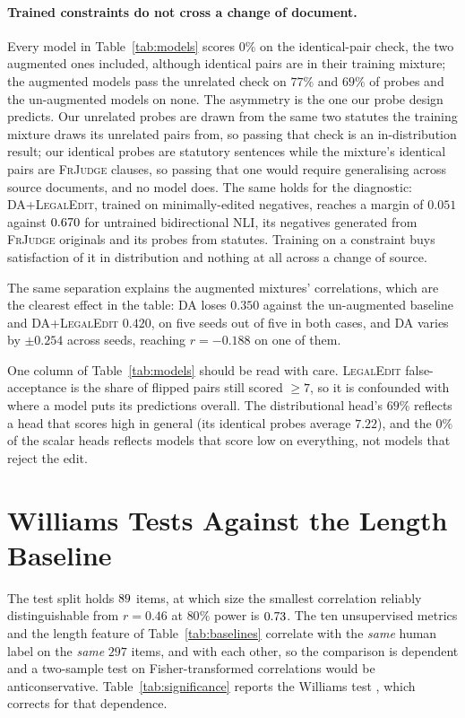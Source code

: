 \documentclass[11pt]{article}
\begin{document}
\paragraph{Trained constraints do not cross a change of document.}
Every model in Table~\ref{tab:models} scores $0\%$ on the identical-pair check,
the two augmented ones included, although identical pairs are in their training
mixture; the augmented models pass the unrelated check on $77\%$ and $69\%$ of
probes and the un-augmented models on none. The asymmetry is the one our probe
design predicts. Our unrelated probes are drawn from the same two statutes the
training mixture draws its unrelated pairs from, so passing that check is an
in-distribution result; our identical probes are statutory sentences while the
mixture's identical pairs are \textsc{FrJudge} clauses, so passing that one
would require generalising across source documents, and no model does. The same
holds for the diagnostic: \textsc{DA+LegalEdit}, trained on minimally-edited
negatives, reaches a margin of $0.051$ against $0.670$ for untrained
bidirectional NLI, its negatives generated from \textsc{FrJudge} originals and
its probes from statutes. Training on a constraint buys satisfaction of it in
distribution and nothing at all across a change of source.

The same separation explains the augmented mixtures' correlations, which are the
clearest effect in the table: \textsc{DA} loses $0.350$ against the un-augmented
baseline and \textsc{DA+LegalEdit} $0.420$, on five seeds out of five in both
cases, and \textsc{DA} varies by $\pm0.254$ across seeds, reaching $r=-0.188$ on
one of them.

One column of Table~\ref{tab:models} should be read with care.
\textsc{LegalEdit} false-acceptance is the share of flipped pairs still scored
$\geq 7$, so it is confounded with where a model puts its predictions overall.
The distributional head's $69\%$ reflects a head that scores high in general
(its identical probes average $7.22$), and the $0\%$ of the scalar heads
reflects models that score low on everything, not models that reject the edit.

\section{Williams Tests Against the Length Baseline}
\label{app:williams}

The test split holds $89$ items, at which size the smallest correlation
reliably distinguishable from $r=0.46$ at $80\%$ power is $0.73$.
The ten unsupervised metrics and the length feature of
Table~\ref{tab:baselines} correlate with the \emph{same} human label on the
\emph{same} $297$ items, and with each other, so the comparison is dependent and a two-sample test on
Fisher-transformed correlations would be anticonservative. Table~\ref{tab:significance}
reports the Williams test \citep{graham2014williams}, which corrects for that
dependence.
\end{document}
